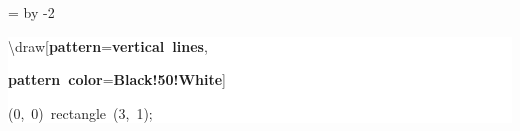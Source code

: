 \begingroup
\ttfamily
{}
=\textwidth
\advance{} by -2\fboxsep
\noindent
\colorbox{background}
{%
\parbox{\dimen255}
{%
\rule[-0.5ex]{0pt}{2.5ex}\hspace*{0.0em}\textbackslash{}draw[\textcolor{R}{\textbf{pattern}}=\textcolor{B}{\textbf{vertical~lines}},\\
\rule[-0.5ex]{0pt}{2.5ex}\hspace*{3.0em}\textcolor{R}{\textbf{pattern~color}}=\textcolor{B}{\textbf{Black!50!White}}]\\
\rule[-0.5ex]{0pt}{2.5ex}\hspace*{3.0em}(0,~0)~rectangle~(3,~1);}%
}%
\endgroup
